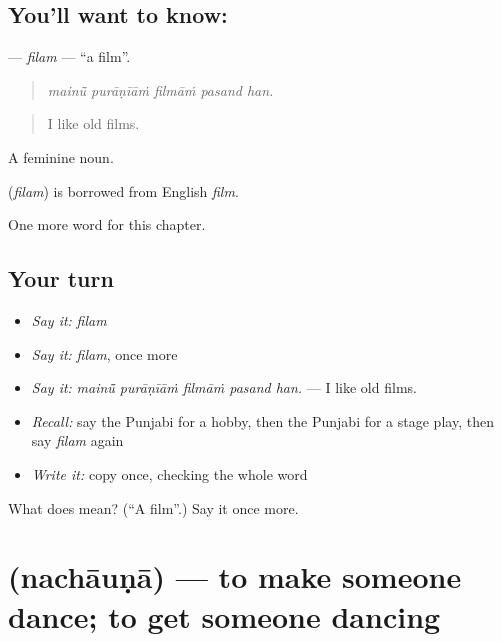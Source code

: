 \subsection*{You'll want to know: }
\textbf{} — \emph{filam} — \textquotedblleft{}a film\textquotedblright{}.

\begin{quote}
    
\end{quote}

\begin{quote}
\emph{mainū̃ purāṇīāṁ filmāṁ pasand han.}
\end{quote}

\begin{quote}
I like old films.
\end{quote}

A feminine noun.

\begin{cousinweb}
\textbf{} (\emph{filam}) is borrowed from English \emph{film}.
\end{cousinweb}

\begin{grammarlens}[title={What you've built}]
One more word for this chapter.
\end{grammarlens}

\subsection*{Your turn}
\begin{itemize}
\raggedright
  \item \emph{Say it:} \emph{filam}
  \item \emph{Say it:} \emph{filam}, once more
  \item \emph{Say it:} \emph{mainū̃ purāṇīāṁ filmāṁ pasand han.} — I like old films.
  \item \emph{Recall:} say the Punjabi for a hobby, then the Punjabi for a stage play, then say \emph{filam} again
  \item \emph{Write it:} copy \textbf{} once, checking the whole word
\end{itemize}

\begin{tcolorbox}[breakable,colback=teal!4,colframe=teal!35!black,title={Before you move on}]
What does  mean? (\textquotedblleft{}A film\textquotedblright{}.) Say it once more.
\end{tcolorbox}
\section[\texorpdfstring{\pa{ਨਚਾਉਣਾ} (nachāuṇā)}{ਨਚਾਉਣਾ (nachāuṇā)}]{ (nachāuṇā) — to make someone dance; to get someone dancing}

